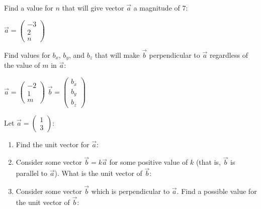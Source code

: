 \documentclass[12pt, twoside]{article}
\begin{document}
\begin{enumerate}[itemsep=6cm]

    \item Find a value for $n$ that will give vector $\vec{a}$ a magnitude of 7:
    
    \begin{center}
        \item $\vec{a} = \begin{pmatrix} -3 \\ 2 \\ n \end{pmatrix}$
    \end{center}

    \item Find values for $b_x$, $b_y$, and $b_z$ that will make $\vec{b}$ perpendicular to $\vec{a}$ regardless of the value of $m$ in $\vec{a}$:
    
    \begin{center}
        $\vec{a} = \begin{pmatrix} -2 \\ 1 \\ m \end{pmatrix}$ \hspace{2cm}
        $\vec{b} = \begin{pmatrix} b_x \\ b_y \\ b_z \end{pmatrix}$
    \end{center}
        
    \newpage

    \item Let $\vec{a} = \begin{pmatrix} 1 \\ 3 \end{pmatrix}$:

    \vspace{1cm}
        
    \begin{enumerate}[itemsep=4cm]
        \item Find the unit vector for $\vec{a}$:

        \item Consider some vector $\vec{b} = k\vec{a}$ for some positive value of $k$ (that is, $\vec{b}$ is parallel to $\vec{a}$). What is the unit vector of $\vec{b}$:

        \item Consider some vector $\vec{b}$ which is perpendicular to $\vec{a}$. Find a possible value for the unit vector of $\vec{b}$:
        

\end{enumerate}
\end{enumerate}
\end{document}
